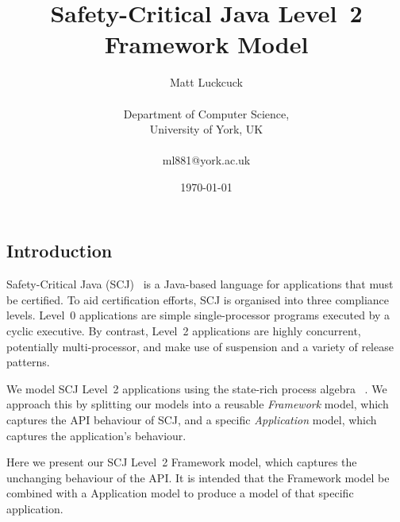 \documentclass{article}
\title{Safety-Critical Java Level~2 Framework Model}
\author{Matt Luckcuck \\\\Department of Computer Science, \\University of York, UK \\\\ml881@york.ac.uk}
\date{\today}
\begin{document}
\begin{report}
\maketitle

\tableofcontents

\newpage

\section{Introduction}

Safety-Critical Java (SCJ)~\cite{SCJ_Spec_0.100} is a Java-based language for applications that must be certified. To aid certification efforts, SCJ is organised into three compliance levels. Level~0 applications are simple single-processor programs executed by a cyclic executive. By contrast, Level~2 applications are highly concurrent, potentially multi-processor, and make use of suspension and a variety of release patterns.

We model SCJ Level~2 applications using the state-rich process algebra \Circus{}~\cite{circus_woodcock_cavalcanti_2002}. We approach this by splitting our models into a reusable \textit{Framework} model, which captures the API behaviour of SCJ, and a specific \textit{Application} model, which captures the application's behaviour.

Here we present our SCJ Level~2 Framework model, which captures the unchanging behaviour of the API. It is intended that the Framework model be combined with a Application model to produce a model of that specific application. 

\end{report}
\end{document}
